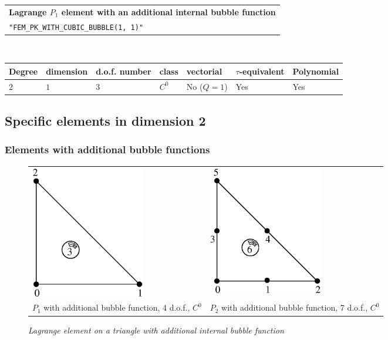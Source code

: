 \documentclass[10pt,a4paper]{article}
\begin{document}
\begin{center}
\begin{tabular}{|m{16.11cm}|} \hline 
{ \bf Lagrange $P_1$ element with an additional internal bubble function}\\
{\tt "FEM\_PK\_WITH\_CUBIC\_BUBBLE(1, 1)"} 
\end{tabular} \\ \vspace{-1pt} 
\begin{tabular}{|m{2cm}|m{2cm}|m{2.5cm}|m{1.2cm}|m{2cm}|m{2cm}|m{1.8cm}|} \hline 
Degree & dimension & d.o.f. number & class & vectorial & \mbox{$\tau$-equivalent} & Polynomial\\ \hline
$2$ & $1$ & $3$ & $C^0$ & No \mbox{($Q = 1$)} & Yes & Yes\\ \hline
\end{tabular}
\end{center}

\subsection{Specific elements in dimension 2}
\subsubsection{Elements with additional bubble functions}

\begin{figure}[H]
  \begin{center}
    \begin{tabular}{m{7cm}m{7cm}}
      \includegraphics[width=5cm,angle=0]{getfemlist_triangle_P1_bubble.eps} & \includegraphics[width=5cm,angle=0]{getfemlist_triangle_P2_bubble.eps}  \\
      $P_1$ with additional bubble function, 4 d.o.f., $C^0$ & $P_2$ with additional bubble function, 7 d.o.f., $C^0$
    \end{tabular}
  \end{center}
  \caption{ \it Lagrange element on a triangle with additional internal bubble function} 
  \label{fig:triangle_p1_bubble}
\end{figure}
\end{document}
